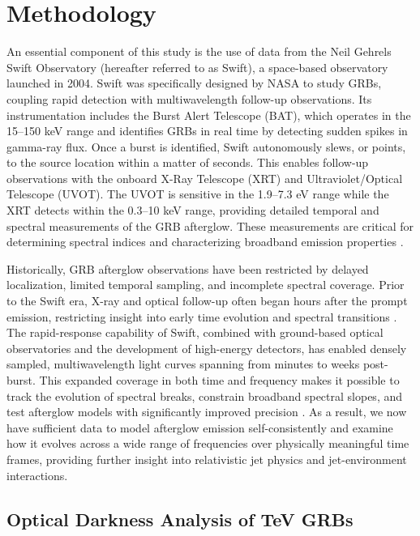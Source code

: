 \documentclass{article}
\begin{document}
\section{Methodology}

An essential component of this study is the use of data from the Neil Gehrels Swift Observatory (hereafter referred to as Swift), a space-based observatory launched in 2004. Swift was specifically designed by NASA to study GRBs, coupling rapid detection with multiwavelength follow-up observations. Its instrumentation includes the Burst Alert Telescope (BAT), which operates in the 15--150 keV range and identifies GRBs in real time by detecting sudden spikes in gamma-ray flux. Once a burst is identified, Swift autonomously slews, or points, to the source location within a matter of seconds. This enables follow-up observations with the onboard X-Ray Telescope (XRT) and Ultraviolet/Optical Telescope (UVOT). The UVOT is sensitive in the 1.9--7.3 eV range while the XRT detects within the 0.3--10 keV range, providing detailed temporal and spectral measurements of the GRB afterglow. These measurements are critical for determining spectral indices and characterizing broadband emission properties \parencite{swift}.

Historically, GRB afterglow observations have been restricted by delayed localization, limited temporal sampling, and incomplete spectral coverage. Prior to the Swift era, X-ray and optical follow-up often began hours after the prompt emission, restricting insight into early time evolution and spectral transitions \parencite{oates}. The rapid-response capability of Swift, combined with ground-based optical observatories and the development of high-energy detectors, has enabled densely sampled, multiwavelength light curves spanning from minutes to weeks post-burst. This expanded coverage in both time and frequency makes it possible to track the evolution of spectral breaks, constrain broadband spectral slopes, and test afterglow models with significantly improved precision \parencite{oates}. As a result, we now have sufficient data to model afterglow emission self-consistently and examine how it evolves across a wide range of frequencies over physically meaningful time frames, providing further insight into relativistic jet physics and jet-environment interactions.

\subsection{Optical Darkness Analysis of TeV GRBs}
\end{document}
